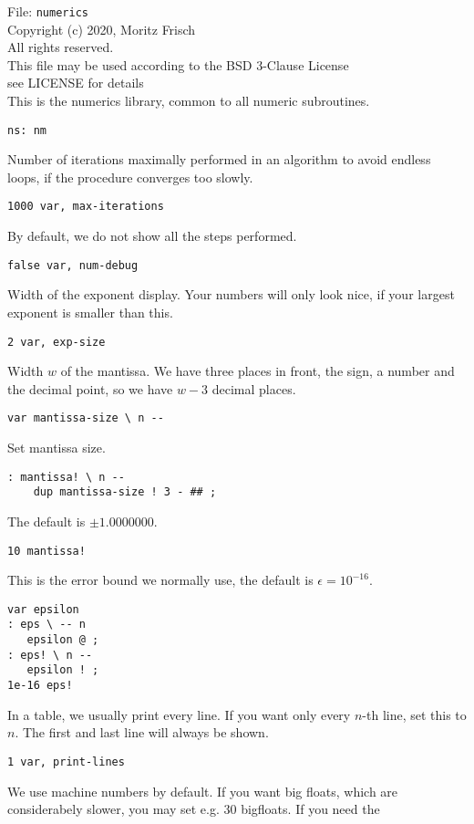 \documentclass{article}
\begin{document}
 
File: \texttt{numerics} \\
Copyright (c) 2020, Moritz Frisch\\
All rights reserved.\\
This file may be used according to the BSD 3-Clause License\\
see LICENSE for details\\
 
This is the numerics library, common to all numeric subroutines.
 
\begin{verbatim}
ns: nm
\end{verbatim}
Number of iterations maximally performed in an algorithm to avoid
endless loops, if the procedure converges too slowly.
\begin{verbatim}
1000 var, max-iterations
\end{verbatim}
By default, we do not show all the steps performed.
\begin{verbatim}
false var, num-debug
\end{verbatim}
Width of the exponent display. Your numbers will only look nice,
if your largest exponent is smaller than this.
\begin{verbatim}
2 var, exp-size
\end{verbatim}
Width $w$ of the mantissa. We have three places in front, the sign,
a number and the decimal point, so we have $w-3$ decimal places.
\begin{verbatim}
var mantissa-size \ n --
\end{verbatim}
Set mantissa size.        
\begin{verbatim}
: mantissa! \ n --
    dup mantissa-size ! 3 - ## ;
\end{verbatim}
The default is $\pm1.0000000$.
\begin{verbatim}
10 mantissa!
\end{verbatim}
This is the error bound we normally use, the default is $\epsilon=10^{-16}$.
\begin{verbatim}
var epsilon
: eps \ -- n
   epsilon @ ;
: eps! \ n --
   epsilon ! ;
1e-16 eps!
\end{verbatim}
In a table, we usually print every line. If you want only every $n$-th line,
set this to $n$. The first and last line will always be shown.
\begin{verbatim}
1 var, print-lines 
\end{verbatim}
We use machine numbers by default. If you want big floats, which are 
considerabely slower, you may set e.g. $30$ bigfloats. If you need the
\end{document}
